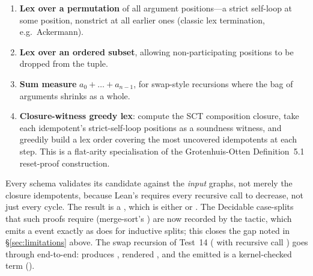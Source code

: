 \begin{enumerate}
  \item \textbf{Lex over a permutation} of all argument positions---a
    strict self-loop at some position, nonstrict at all earlier ones
    (classic lex termination, e.g.\ Ackermann).
  \item \textbf{Lex over an ordered subset}, allowing non-participating
    positions to be dropped from the tuple.
  \item \textbf{Sum measure} \(a_0+\dots+a_{n-1}\), for swap-style
    recursions where the bag of arguments shrinks as a whole.
  \item \textbf{Closure-witness greedy lex}: compute the SCT composition
    closure, take each idempotent's strict-self-loop positions as a
    soundness witness, and greedily build a lex order covering the most
    uncovered idempotents at each step. This is a flat-arity
    specialisation of the Grotenhuis-Otten Definition~5.1 reset-proof
    construction.
\end{enumerate}

Every schema validates its candidate against the \emph{input} graphs, not
merely the closure idempotents, because Lean's 
requires every recursive call to decrease, not just every cycle. The
result is a , which is either  or
. The Decidable case-splits that such proofs require
(merge-sort's ) are now recorded by the 
tactic, which emits a  event exactly as
 does for inductive splits; this closes the gap noted
in §\ref{sec:limitations} above. The swap recursion of Test~14
( with recursive call ) goes through
end-to-end:  produces , rendered
, and the emitted  is a
kernel-checked term ().


